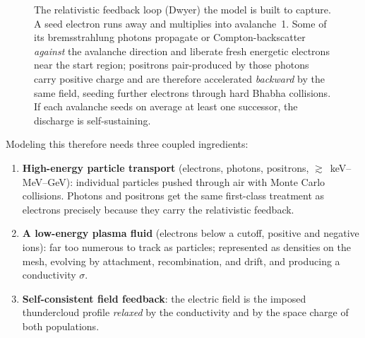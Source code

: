 \documentclass[11pt]{article}
\begin{document}
\begin{figure}[H]
  \caption{The relativistic feedback loop (Dwyer) the model is built to
  capture. A seed electron runs away and multiplies into avalanche~1. Some
  of its bremsstrahlung photons propagate or Compton-backscatter
  \emph{against} the avalanche direction and liberate fresh energetic
  electrons near the start region; positrons pair-produced by those photons
  carry positive charge and are therefore accelerated \emph{backward} by the
  same field, seeding further electrons through hard Bhabha collisions. If each
  avalanche seeds on average at least one successor, the discharge is
  self-sustaining.}
  \label{fig:feedback}
\end{figure}

Modeling this therefore needs three coupled ingredients:

\begin{enumerate}
  \item \textbf{High-energy particle transport} (electrons, photons,
  positrons, $\gtrsim$~keV--MeV--GeV): individual particles pushed through
  air with Monte Carlo collisions. Photons and positrons get the same
  first-class treatment as electrons precisely because they carry the
  relativistic feedback.
  \item \textbf{A low-energy plasma fluid} (electrons below a cutoff,
  positive and negative ions): far too numerous to track as particles;
  represented as densities on the mesh, evolving by attachment,
  recombination, and drift, and producing a conductivity $\sigma$.
  \item \textbf{Self-consistent field feedback}: the electric field is the
  imposed thundercloud profile \emph{relaxed} by the conductivity and by the
  space charge of both populations.
\end{enumerate}
\end{document}
